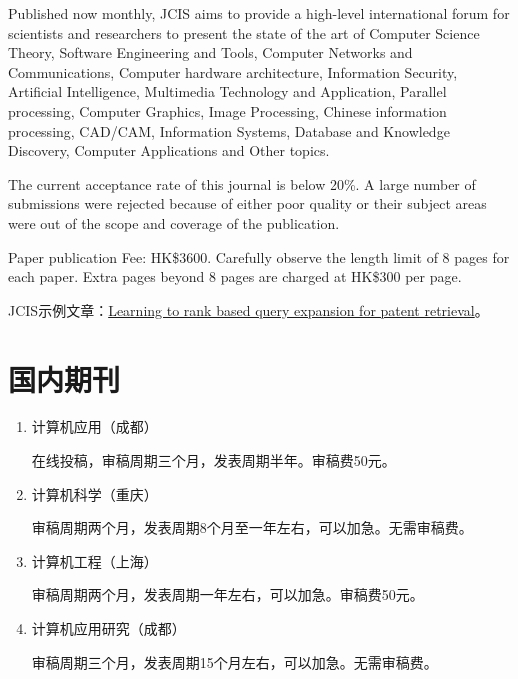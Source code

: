 \begin{enumerate}[（1）]
Published now monthly, JCIS aims to provide a high-level international forum for scientists and researchers to present the state of the art of Computer Science Theory, Software Engineering and Tools, Computer Networks and Communications, Computer hardware architecture, Information Security, Artificial Intelligence, Multimedia Technology and Application, Parallel processing, Computer Graphics, Image Processing, Chinese information processing, CAD/CAM, Information Systems, Database and Knowledge Discovery, Computer Applications and Other topics.

The current acceptance rate of this journal is below 20\%. A large number of submissions were rejected because of either poor quality or their subject areas were out of the scope and coverage of the publication.

Paper publication Fee: HK\$3600. Carefully observe the length limit of 8 pages for each paper. Extra pages beyond 8 pages are charged at HK\$300 per page.

JCIS示例文章：\href{http://www.jofcis.com/publishedpapers/2013\_9\_13\_5387\_5394.pdf}{Learning to rank based query expansion for patent retrieval}。
\end{enumerate}

\section{国内期刊}
\begin{enumerate}
\item 计算机应用（成都）

在线投稿，审稿周期三个月，发表周期半年。审稿费50元。

\item 计算机科学（重庆）

审稿周期两个月，发表周期8个月至一年左右，可以加急。无需审稿费。

\item 计算机工程（上海）

审稿周期两个月，发表周期一年左右，可以加急。审稿费50元。

\item 计算机应用研究（成都）

审稿周期三个月，发表周期15个月左右，可以加急。无需审稿费。
\end{enumerate}
